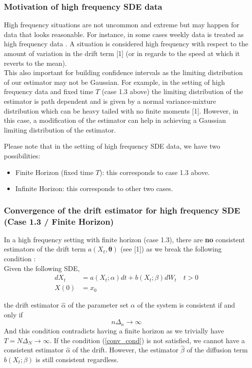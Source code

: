 \documentclass[aspectratio=169]{beamer}\usepackage[utf8]{inputenc}
\begin{document}
\begin{frame}\frametitle{Motivation of high frequency SDE data}

High frequency situations are not uncommon and extreme  but may happen for data that looks reasonable. For instance, in some cases  weekly data is treated as high frequency data . A situation is considered high frequency with respect to the amount of  variation in the drift term [1] (or in regards to the speed at which it reverts to the mean).  \\

This also important for building confidence intervals as the limiting distribution of our estimator may not be Gaussian. For example, in the setting of high frequency data and fixed time $T$ (case 1.3 above) the limiting distribution of the estimator is path dependent and is given by a normal variance-mixture distribution which can be heavy tailed with no finite moments [1]. However, in this case, a  modification of the estimator can help in achieving  a Gaussian limiting distribution of the estimator.

Please note that in the setting of high frequency SDE data, we have two possibilities:
\begin{itemize}
\item Finite Horizon (fixed time $T$): this corresponds to case 1.3 above.
\item Infinite Horizon: this corresponds to other two cases.
\end{itemize}


\end{frame}

\begin{frame}\frametitle{Convergence of the drift estimator for high frequency  SDE  \\(Case 1.3 / Finite Horizon)}

In a high frequency setting with finite horizon (case 1.3), there are \textbf{no} consistent estimators of the drift term $a(X_t, \bm{\theta})$ (see [1]) as we break the following condition :\\

Given the following SDE,
\begin{equation}
\begin{split}
dX_t &= a(X_t; \alpha) dt + b(X_t; \beta ) dW_t \quad t > 0 \\
X(0) & = x_0
\end{split}\label{main}
\end{equation}

the drift estimator  $\hat{\alpha}$ of the parameter set $\alpha$ of the system is consistent if and only if
\begin{equation}
n \Delta_n \to \infty  \label{conv_cond}
\end{equation}
And this condition contradicts having a finite horizon as we trivially have $T=N \Delta_N \to \infty$. If the  condition (\ref{conv_cond}) is not satisfied, we cannot have a consistent estimator  $\hat{\alpha}$ of the drift. However, the estimator $\hat{\beta}$ of the diffusion term $b (X_t; \beta)$ is still consistent regardless. 
\end{frame}
\end{document}
